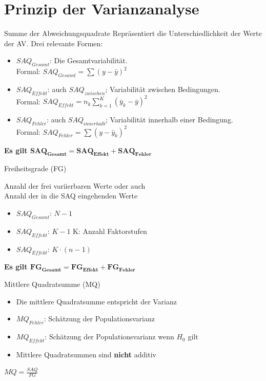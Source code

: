 \documentclass{beamer}
\begin{document}
	\section{Prinzip der Varianzanalyse}
		
	
	\begin{frame}{Summe der Abweichungsquadrate}
		Repräsentiert die Unterschiedlichkeit der Werte der AV.
		Drei relevante Formen:
		\begin{itemize} \itemsep=2ex
			\item $SAQ_{Gesamt}$: Die Gesamtvariabilität.\\
			Formal: $SAQ_{Gesamt}= \sum(y - \bar{y})^2$
			\item $SAQ_{Effekt}$: auch $SAQ_{zwischen}$; Variabilität zwischen Bedingungen.\\
			Formal: $SAQ_{Effekt} = n_k \sum_{k=1}^{K} (\bar{y}_k - \bar{y})^2$ 
			\item $SAQ_{Fehler}$: auch $SAQ_{innerhalb}$; Variabilität innerhalb einer Bedingung.\\
			Formal: $SAQ_{Fehler} = \sum (y - \bar{y}_k)^2$ 
		\end{itemize}
		\begin{center}
			\textbf{Es gilt $\mathbf{SAQ_{Gesamt} = SAQ_{Effekt} + SAQ_{Fehler}}$}
		\end{center}
	\end{frame}
	
		
	\begin{frame}{Freiheitsgrade (FG)}	
		
		Anzahl der frei variierbaren Werte oder auch \\
		Anzahl der in die SAQ eingehenden Werte
		\begin{itemize}
			\item $SAQ_{Gesamt}$: $N-1$
			\item $SAQ_{Effekt}$: $K-1$ \hspace{3em} K: Anzahl Faktorstufen
			\item $SAQ_{Effekt}$: $K \cdot (n-1)$
		\end{itemize}
		\textbf{Es gilt $\mathbf{FG_{Gesamt} = FG_{Effekt} + FG_{Fehler}}$}

	\end{frame}
	
	\begin{frame}{Mittlere Quadratsumme (MQ)}
		\begin{itemize}\itemsep=2ex
			\item Die mittlere Quadratsumme entspricht der Varianz
			\item $MQ_{Fehler}$: Schätzung der Populationsvarianz
			\item $MQ_{Effekt}$: Schätzung der Populationsvarianz wenn $H_0$ gilt
			\item Mittlere Quadratsummen sind \textbf{nicht} additiv
		\end{itemize}
		\begin{center}
			$MQ = \frac{SAQ}{FG}$
		\end{center}
	\end{frame}
	
\end{document}
